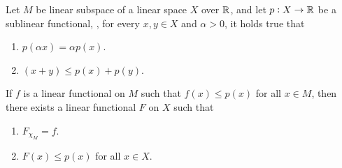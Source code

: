 \begin{thm}
\label{thm:bounded_linear_operator:hahn_banach_real}
Let $M$ be linear subspace of a linear space $X$ over $\mathbb{R}$, and let $p: X 
\to \mathbb{R}$ be a sublinear functional, \ie, for every $x, y \in X$ and $\alpha 
> 0$, it holds true that 
\begin{enumerate}
    \item $p(\alpha x) = \alpha p(x)$. 
    \item $(x + y) \le p(x) + p(y)$. 
\end{enumerate}
If $f$ is a linear functional on $M$ such that $f(x) \le p(x)$ for all 
$x \in M$, then there exists a linear functional $F$ on $X$ such that 
\begin{enumerate}
    \item $F_{\chi_M} = f$. 
    \item $F(x) \le p(x)$ for all $x \in X$. 
\end{enumerate}
\end{thm}
